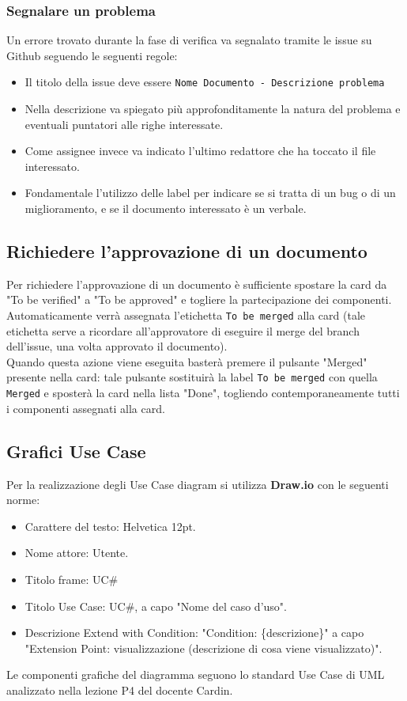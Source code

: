 \subsubsection{Segnalare un problema}
Un errore trovato durante la fase di verifica va segnalato tramite le issue su Github
seguendo le seguenti regole:
\begin{itemize}
    \item Il titolo della issue deve essere
    \texttt{Nome Documento - Descrizione problema}
    \item Nella descrizione va spiegato più approfonditamente la natura del
    problema e eventuali puntatori alle righe interessate.
    \item  Come assignee invece va indicato l'ultimo redattore che ha toccato il file
    interessato.
    \item Fondamentale l'utilizzo delle label per indicare se si tratta
    di un bug o di un miglioramento, e se il documento interessato è un verbale.
\end{itemize}

\subsection{Richiedere l'approvazione di un documento}
Per richiedere l'approvazione di un documento è sufficiente spostare la card da "To be verified" a "To be approved" 
e togliere la partecipazione dei componenti.\\ 
Automaticamente verrà assegnata l'etichetta \texttt{To be merged} alla card (tale etichetta serve a ricordare all'approvatore 
di eseguire il merge del branch dell'issue, una volta approvato il documento).\\
Quando questa azione viene eseguita basterà premere il pulsante "Merged" presente nella card: tale pulsante sostituirà la label 
\texttt{To be merged} con quella \texttt{Merged} e sposterà la card nella lista "Done", togliendo contemporaneamente tutti i 
componenti assegnati alla card.

\subsection{Grafici Use Case}
Per la realizzazione degli Use Case diagram si utilizza \textbf{Draw.io} con le seguenti norme:
\begin{itemize}
\item Carattere del testo: Helvetica 12pt.
\item Nome attore: Utente.
\item Titolo frame: UC\#
\item Titolo Use Case: UC\#, a capo "Nome del caso d'uso".
\item Descrizione Extend with Condition: "Condition: \{descrizione\}" a capo "Extension Point: visualizzazione (descrizione di cosa viene visualizzato)".
\end{itemize}
Le componenti grafiche del diagramma seguono lo standard Use Case di UML analizzato nella lezione P4 del docente Cardin. \\


